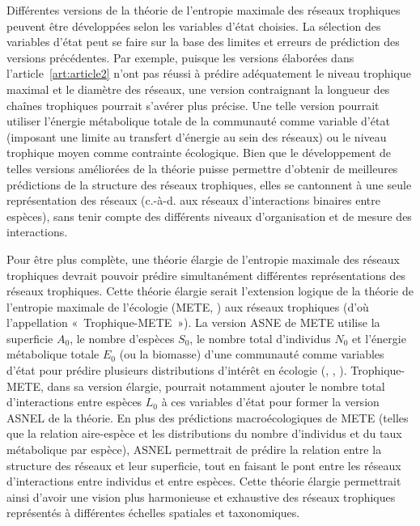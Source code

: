 Différentes versions de la théorie de l'entropie maximale des réseaux trophiques
peuvent être développées selon les variables d'état choisies. La sélection des
variables d'état peut se faire sur la base des limites et erreurs de prédiction
des versions précédentes. Par exemple, puisque les versions élaborées dans
l'article~\ref{art:article2} n'ont pas réussi à prédire adéquatement le niveau
trophique maximal et le diamètre des réseaux, une version contraignant la
longueur des chaînes trophiques pourrait s'avérer plus précise. Une telle
version pourrait utiliser l'énergie métabolique totale de la communauté comme
variable d'état (imposant une limite au transfert d'énergie au sein des réseaux)
ou le niveau trophique moyen comme contrainte écologique. Bien que le
développement de telles versions améliorées de la théorie puisse permettre
d'obtenir de meilleures prédictions de la structure des réseaux trophiques,
elles se cantonnent à une seule représentation des réseaux (c.-à-d. aux réseaux
d'interactions binaires entre espèces), sans tenir compte des différents niveaux
d'organisation et de mesure des interactions.

Pour être plus complète, une théorie élargie de l'entropie maximale des réseaux
trophiques devrait pouvoir prédire simultanément différentes représentations des
réseaux trophiques. Cette théorie élargie serait l'extension logique de la
théorie de l'entropie maximale de l'écologie (METE, \cite{Harte2011Maximum}) aux
réseaux trophiques (d'où l'appellation «~Trophique-METE~»). La version ASNE de
METE utilise la superficie $A_0$, le nombre d'espèces $S_0$, le nombre total
d'individus $N_0$ et l'énergie métabolique totale $E_0$ (ou la biomasse) d'une
communauté comme variables d'état pour prédire plusieurs distributions d'intérêt
en écologie (\cite{Harte2008Maximum}, \cite{Harte2011Maximum},
\cite{Harte2014Maximum}). Trophique-METE, dans sa version élargie, pourrait
notamment ajouter le nombre total d'interactions entre espèces $L_0$ à ces
variables d'état pour former la version ASNEL de la théorie. En plus des
prédictions macroécologiques de METE (telles que la relation aire-espèce et les
distributions du nombre d'individus et du taux métabolique par espèce), ASNEL
permettrait de prédire la relation entre la structure des réseaux et leur
superficie, tout en faisant le pont entre les réseaux d'interactions entre
individus et entre espèces. Cette théorie élargie permettrait ainsi d'avoir une
vision plus harmonieuse et exhaustive des réseaux trophiques représentés à
différentes échelles spatiales et taxonomiques.

